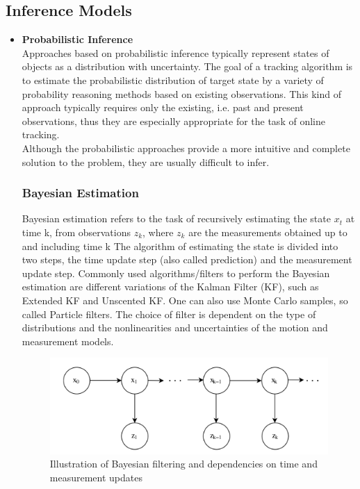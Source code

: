     \subsection{Inference Models}
        \begin{itemize}
            \item \textbf{Probabilistic Inference} \\ 
                Approaches based on probabilistic inference typically  represent states of objects as a distribution with uncertainty. The goal of a tracking algorithm is to estimate the probabilistic distribution of target state 
                by a variety of probability reasoning methods based on existing observations. This kind of approach typically requires only the existing, i.e. past and present observations, thus they are especially appropriate for 
                the task of online tracking. \\
                \vspace{3mm}
                Although the probabilistic approaches provide a more intuitive and complete solution to the problem, they are usually difficult to infer.
                \subsubsection{Bayesian Estimation}
                    Bayesian estimation refers to the task of recursively estimating the state \textbf{$x_t$} at time k, from observations \emph{$z_k$}, where \emph{$z_k$} are the measurements obtained up to and including time k 
                    The algorithm of estimating the state is divided into two steps, the time update step (also called prediction) and the measurement update step. Commonly used algorithms/filters to perform the Bayesian estimation 
                    are different variations of the Kalman Filter (KF), such as Extended KF and Unscented KF. One can also use Monte Carlo samples, so called Particle filters. The choice of filter is dependent on the type of distributions 
                    and the nonlinearities and uncertainties of the motion and measurement models.
                    \begin{figure}[H]
                        \centering
                        \includegraphics[width=0.6\linewidth]{img/Bayesian.png}
                        \caption{Illustration of Bayesian filtering and dependencies on time and measurement updates}
                    \end{figure}

\end{itemize}
